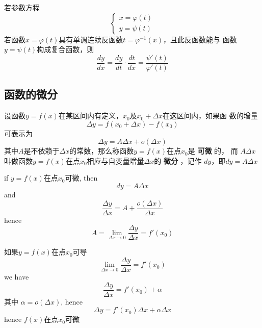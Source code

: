 \documentclass[11pt]{article}
\begin{document}
若参数方程
\begin{equation*}
\begin{cases}
x=\varphi(t)\\
y=\psi(t)
\end{cases}
\end{equation*}
若函数\(x=\varphi(t)\)具有单调连续反函数\(t=\varphi^{-1}(x)\)，且此反函数能与
函数\(y=\psi(t)\)构成复合函数，则
\begin{equation*}
\frac{dy}{dx}=\frac{dy}{dt}\cdot\frac{dt}{dx}=\frac{\psi'(t)}{\varphi'(t)}
\end{equation*}
\subsection{函数的微分}
\label{sec:org9a25521}
\begin{definition}[]
设函数\(y=f(x)\)在某区间内有定义，\(x_0\)及\(x_0+\Delta x\)在这区间内，如果函
数的增量
\begin{equation*}
\Delta y=f(x_0+\Delta x)-f(x_0)
\end{equation*}
可表示为
\begin{equation*}
\Delta y=A\Delta x+o(\Delta x)
\end{equation*}
其中\(A\)是不依赖于\(\Delta x\)的常数，那么称函数\(y=f(x)\)在点\(x_0\)是 \textbf{可微} 的，
而 \(A\Delta x\) 叫做函数\(y=f(x)\)在点\(x_0\)相应与自变量增量\(\Delta x\)的 \textbf{微分}
，记作 \(dy\)，即\(dy=A\Delta x\)
\end{definition}

if \(y=f(x)\)在点\(x_0\)可微, then
\begin{equation*}
dy=A\Delta x
\end{equation*}
and
\begin{equation*}
\frac{\Delta y}{\Delta x}=A+\frac{o(\Delta x)}{\Delta x}
\end{equation*}
hence
\begin{equation*}
A=\lim_{\Delta x\to0}\frac{\Delta y}{\Delta x}=f'(x_0)
\end{equation*}

如果\(y=f(x)\)在点\(x_0\)可导
\begin{equation*}
\lim_{\Delta x\to0}\frac{\Delta y}{\Delta x}=f'(x_0)
\end{equation*}
we have
\begin{equation*}
\frac{\Delta y}{\Delta x}=f'(x_0)+\alpha
\end{equation*}
其中 \(\alpha=o(\Delta x)\), hence
\begin{equation*}
\Delta y=f'(x_0)\Delta x+\alpha\Delta x
\end{equation*}
hence \(f(x)\)在点\(x_0\)可微
\end{document}

